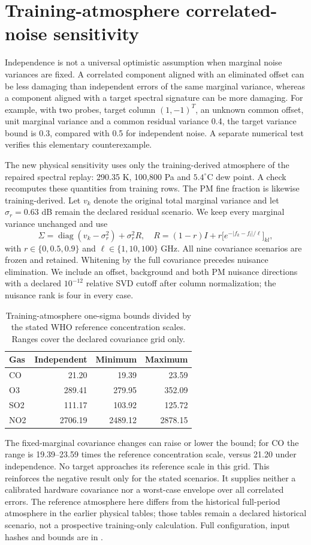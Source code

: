 \section{Training-atmosphere correlated-noise sensitivity}
Independence is not a universal optimistic assumption when marginal noise variances are fixed. A correlated component aligned with an eliminated offset can be less damaging than independent errors of the same marginal variance, whereas a component aligned with a target spectral signature can be more damaging. For example, with two probes, target column $(1,-1)^T$, an unknown common offset, unit marginal variance and a common residual variance 0.4, the target variance bound is 0.3, compared with 0.5 for independent noise. A separate numerical test verifies this elementary counterexample.

The new physical sensitivity uses only the training-derived atmosphere of the repaired spectral replay: 290.35 K, 100,800 Pa and $5.4^\circ$C dew point. A check recomputes these quantities from training rows. The PM fine fraction is likewise training-derived. Let $v_k$ denote the original total marginal variance and let $\sigma_r=0.63$ dB remain the declared residual scenario. We keep every marginal variance unchanged and use
\[
\Sigma=\operatorname{diag}(v_k-\sigma_r^2)+\sigma_r^2R,
\quad R=(1-r)I+r\big[e^{-|f_k-f_l|/\ell}\big]_{kl},
\]
with $r\in\{0,0.5,0.9\}$ and $\ell\in\{1,10,100\}$ GHz. All nine covariance scenarios are frozen and retained. Whitening by the full covariance precedes nuisance elimination. We include an offset, background and both PM nuisance directions with a declared $10^{-12}$ relative SVD cutoff after column normalization; the nuisance rank is four in every case.

\begin{table}[t]\centering\small
\caption{Training-atmosphere one-sigma bounds divided by the stated WHO reference concentration scales. Ranges cover the declared covariance grid only.}
\begin{tabular}{lrrr}\toprule
Gas & Independent & Minimum & Maximum\\\midrule
CO & 21.20 & 19.39 & 23.59\\
O3 & 289.41 & 279.95 & 352.09\\
SO2 & 111.17 & 103.92 & 125.72\\
NO2 & 2706.19 & 2489.12 & 2878.15\\
\bottomrule\end{tabular}\end{table}

The fixed-marginal covariance changes can raise or lower the bound; for CO the range is 19.39--23.59 times the reference concentration scale, versus 21.20 under independence. No target approaches its reference scale in this grid. This reinforces the negative result only for the stated scenarios. It supplies neither a calibrated hardware covariance nor a worst-case envelope over all correlated errors. The reference atmosphere here differs from the historical full-period atmosphere in the earlier physical tables; those tables remain a declared historical scenario, not a prospective training-only calculation. Full configuration, input hashes and bounds are in .

